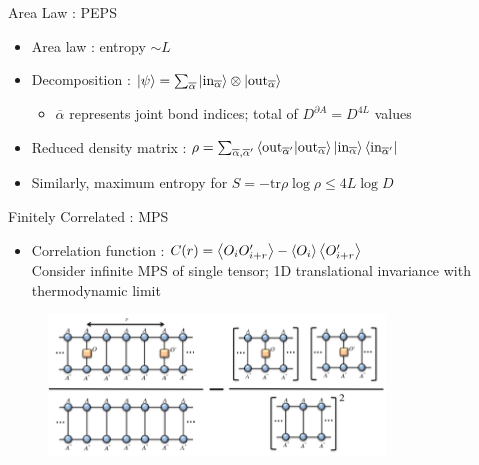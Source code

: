 \documentclass{beamer}
\begin{document}
\begin{frame}{Area Law : PEPS}
	\begin{itemize}
	\item Area law : entropy ${ \sim  L}$
	\item Decomposition : ${ \ket{\psi }= \sum_{\overline{\alpha }}^{} \ket{\text{in}_{\overline{\alpha }}}\otimes \ket{\text{out}_{\overline{\alpha }}}}$
		\begin{itemize}
		\item ${ \overline{\alpha } }$ represents joint bond indices; total of ${ D^{\partial A} =D^{4L}}$ values
		\end{itemize}
	\item Reduced density matrix : ${ \rho =\sum_{\overline{\alpha },\overline{\alpha }^{\prime}}^{} \ev{\text{out}_{\overline{\alpha }^{\prime}}|\text{out}_{\overline{\alpha }}}\ket{\text{in}_{\overline{\alpha }}}\bra{\text{in}_{\overline{\alpha }^{\prime}}} }$
	\item Similarly, maximum entropy for ${ S=-\text{tr}\rho \log{\rho }\leq  4L \log{D}}$
	\end{itemize}
\end{frame}


\begin{frame}{Finitely Correlated : MPS}
\begin{itemize}
	\item Correlation function : ${ C(r)=\ev{O_{i}O^{\prime}_{i+r}} - \ev{O_{i}}\ev{O^{\prime}_{i+r}} }$\\
		Consider infinite MPS of single tensor; 1D translational invariance with thermodynamic limit
\end{itemize}	
	\begin{figure}[h]
	\includegraphics[width=0.8\textwidth]{corr}
	\centering
	\end{figure}
\end{frame}
\end{document}
